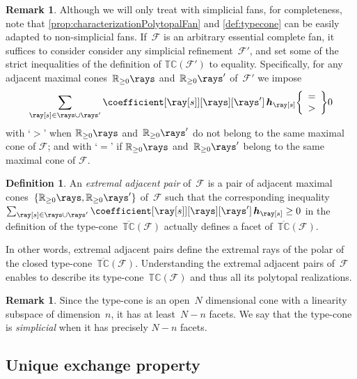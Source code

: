 \documentclass{amsart}
\theoremstyle{definition}
\newtheorem{definition}[theorem]{Definition}
\newtheorem{remark}[theorem]{Remark}
\newcommand{\R}{\mathbb{R}} %
\renewcommand{\b}[1]{{\boldsymbol{#1}}} %
\newcommand{\darkblue}{\color{darkblue}} %
\newcommand{\defn}[1]{\textsl{\darkblue #1}} %
\newcommand{\arnau}[1]{\todo[color=orange!30]{#1 --- A.}}
\newcommand{\Fan}{\mathcal{F}} %
\newcommand{\typeCone}{\mathbb{TC}} %
\newcommand{\ctypeCone}{\overline{\mathbb{TC}}} %
\begin{document}
\begin{remark}
 \label{rmk:non-simplicial}
Although we will only treat with simplicial fans, for completeness, note that \cref{prop:characterizationPolytopalFan} and \cref{def:typecone} can be easily adapted to non-simplicial fans. If~$\Fan$ is an arbitrary essential complete fan, it suffices to consider consider any simplicial refinement~$\Fan'$, and set some of the strict inequalities of the definition of $\typeCone(\Fan')$ to equality. Specifically, for any adjacent maximal cones~$\R_{\ge0}\rays$ and~$\R_{\ge0}\rays'$ of~$\Fan'$ we impose
\[
 \sum_{\ray[s] \in \rays \cup \rays'} \coefficient[{\ray[s]}][\rays][\rays'] \, \b{h}_{\ray[s]} {\left\{\begin{array}{l} =\\ >\end{array}\right\}} 0
\]
with `$>$' when $\R_{\ge0}\rays$ and~$\R_{\ge0}\rays'$ do not belong to the same maximal cone of $\Fan$; and with `$=$' if $\R_{\ge0}\rays$ and~$\R_{\ge0}\rays'$ belong to the same maximal cone of $\Fan$.
\end{remark}


\begin{definition}
An \defn{extremal adjacent pair} of~$\Fan$ is a pair of adjacent maximal cones~$\{\R_{\ge0}\rays, \R_{\ge0}\rays'\}$ of~$\Fan$ such that the corresponding inequality $\sum_{\ray[s] \in \rays \cup \rays'} \coefficient[{\ray[s]}][\rays][\rays'] \, \b{h}_{\ray[s]} \geq 0$ in the definition of the type-cone~$\ctypeCone(\Fan)$ actually defines a facet of~$\ctypeCone(\Fan)$.
\end{definition}
\arnau{I changed open to closed here}

In other words, extremal adjacent pairs define the extremal rays of the polar of the closed type-cone~$\ctypeCone(\Fan)$.
Understanding the extremal adjacent pairs of~$\Fan$ enables to describe its type-cone~$\typeCone(\Fan)$ and thus all its polytopal realizations.

\begin{remark}
\label{rem:dimTypeCone}
Since the type-cone is an open~$N$ dimensional cone with a linearity subspace of dimension~$n$, it has at least~$N-n$ facets.
We say that the type-cone is \defn{simplicial} when it has precisely $N-n$ facets.
\end{remark}


\subsection{Unique exchange property}
\label{subsec:uniqueExchangeProperty}
\end{document}
